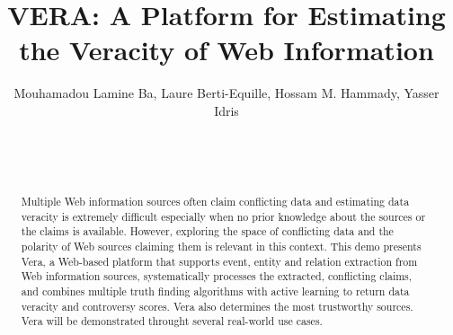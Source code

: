 \documentclass{sig-alternate}
\begin{document}
\conferenceinfo{}{}

\title{VERA: A Platform for Estimating the Veracity of Web Information}

\author{
\alignauthor
Mouhamadou Lamine Ba, Laure Berti-Equille, Hossam M. Hammady, Yasser Idris\\
       \\
       \\
       \\
}


\maketitle

\begin{abstract}
Multiple Web information sources often claim conflicting data and estimating data veracity is extremely difficult especially when no prior knowledge about the sources or the claims is available. However, exploring the space of conflicting data and the polarity of Web sources claiming them is relevant in this context.
This demo presents Vera, a Web-based platform that supports event, entity and relation
extraction from Web information sources, systematically processes the extracted, conflicting claims, and
combines multiple truth finding algorithms with active learning to return data veracity and controversy scores. Vera also determines the most trustworthy sources. Vera will be demonstrated throught several real-world use cases.
\end{abstract}

\end{document}
